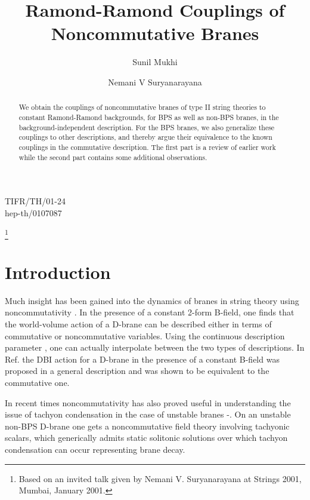 \documentclass[a4paper,a4paper]{amsproc}
\theoremstyle{definition}
\theoremstyle{remark}
\numberwithin{equation}{section}
\begin{document}
\begin{flushright}
TIFR/TH/01-24\\
hep-th/0107087\\
\end{flushright}
\vspace{1truecm}

\title{Ramond-Ramond Couplings of Noncommutative Branes}

\author{Sunil Mukhi}
\thanks{Based 
on an invited talk given by Nemani V. Suryanarayana at Strings 2001,
Mumbai, January 2001\cite{talklink}.}

\author{Nemani V Suryanarayana} 
\address{Tata Institute of Fundamental
Research, Homi Bhabha Rd, Mumbai 400 005, India}



\begin{abstract}
We obtain the couplings of noncommutative branes of type II string
theories to constant Ramond-Ramond backgrounds, for BPS as well as
non-BPS branes, in the background-independent description. For the BPS
branes, we also generalize these couplings to other descriptions, and
thereby argue their equivalence to the known couplings in the
commutative description. The first part is a review of earlier work
while the second part contains some additional observations.
\end{abstract}

\maketitle

\section{Introduction}
Much insight has been gained into the dynamics of branes in string
theory using noncommutativity \cite{noncommrefs, SW}. In the presence
of a constant 2-form B-field, one finds that the world-volume action
of a D-brane can be described either in terms of commutative or
noncommutative variables. Using the continuous description parameter
\myHighlight{$\Phi$}\coordHE{}, one can actually interpolate between the two types of
descriptions. In Ref.\cite{SW} the DBI action for a D-brane in the
presence of a constant B-field was proposed in a general description
and was shown to be equivalent to the commutative one.

In recent times noncommutativity has also proved useful in
understanding the issue of tachyon condensation in the case of
unstable branes \cite{gmsone}-\cite{sennew}. On an unstable non-BPS
D-brane one gets a noncommutative field theory involving tachyonic
scalars, which generically admits static solitonic solutions over
which tachyon condensation can occur representing brane decay.
\end{document}
